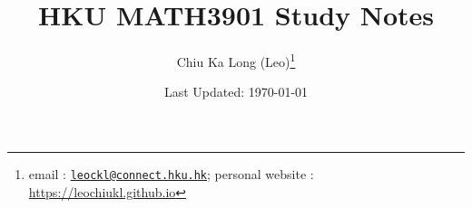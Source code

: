 \documentclass{article}
\begin{document}
\title{HKU MATH3901 Study Notes}
\author{Chiu Ka Long (Leo)\thanks{
email :
\href{mailto:leockl@connect.hku.hk}{\texttt{leockl@connect.hku.hk}};
personal website :
\url{https://leochiukl.github.io}
}}
\date{Last Updated: \today}
\maketitle
\doclicenseThis
\tableofcontents
\nocite{*}


\printbibliography

\end{document}
